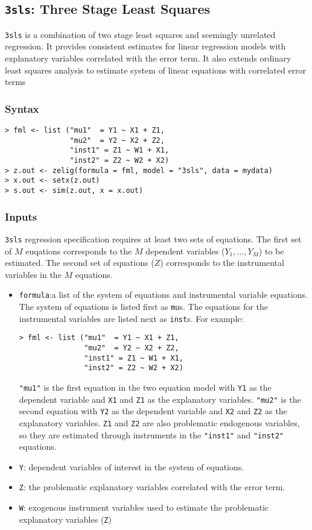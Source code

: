\documentclass[12pt]{book}%
\begin{document}
\subsection{\texttt{3sls}: Three Stage Least Squares}
\label{3sls}
\texttt{3sls} is a combination of two stage least squares
and seemingly unrelated regression. It provides consistent estimates for linear regression models with 
explanatory variables correlated with the error term. It also extends ordinary least squares 
analysis to estimate system of linear equations with correlated error terms
\subsubsection{Syntax}
\begin{verbatim}
> fml <- list ("mu1"  = Y1 ~ X1 + Z1,
               "mu2"  = Y2 ~ X2 + Z2,
               "inst1" = Z1 ~ W1 + X1,
               "inst2" = Z2 ~ W2 + X2)
> z.out <- zelig(formula = fml, model = "3sls", data = mydata)
> x.out <- setx(z.out)
> s.out <- sim(z.out, x = x.out)
\end{verbatim}
\subsubsection{Inputs}
\texttt{3sls} regression specification requires at least two sets of equations. The first set of $M$ euqations
corresponds to the $M$ dependent variables ($Y_1,\ldots,Y_M$) to be estimated. The second set of equations ($Z$)
corresponds to the instrumental variables in the $M$ equations.
\begin{itemize}
\item \texttt{formula}:a list of the system of equations and instrumental variable 
equations. The system of equations is listed first as \texttt{mu}s. The equations
for the instrumental variables are listed next as \texttt{inst}s.
For example:
\begin{verbatim}
> fml <- list ("mu1"  = Y1 ~ X1 + Z1,
               "mu2"  = Y2 ~ X2 + Z2,
               "inst1" = Z1 ~ W1 + X1,
               "inst2" = Z2 ~ W2 + X2)
\end{verbatim}
\texttt{"mu1"} is the first equation in the two equation model with \texttt{Y1}
as the dependent variable and \texttt{X1} and \texttt{Z1} as
the explanatory variables. \texttt{"mu2"} is the second equation with 
\texttt{Y2} as the dependent variable
and \texttt{X2} and \texttt{Z2} as the explanatory variables. 
\texttt{Z1} and \texttt{Z2} are also problematic endogenous variables, so
they are estimated through instruments in the \texttt{"inst1"} 
and \texttt{"inst2"} equations.
\item \texttt{Y}: dependent variables of interest in the system of equations.
\item \texttt{Z}: the problematic explanatory variables correlated with 
the error term.
\item \texttt{W}: exogenous instrument variables used to estimate the 
problematic explanatory variables (\texttt{Z})
\end{itemize}
\end{document}
